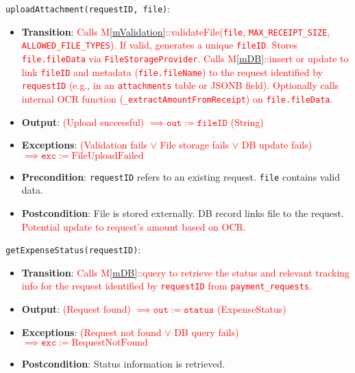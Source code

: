 \documentclass[12pt, titlepage]{article}
\providecommand{\mref}[1]{M\ref{#1}}
\begin{document}
\noindent \texttt{uploadAttachment(requestID, file)}:
\begin{itemize}
    \item \textbf{Transition}: \textcolor{red}{Calls \mref{mValidation}::validateFile(\texttt{file}, \texttt{MAX\_RECEIPT\_SIZE}, \texttt{ALLOWED\_FILE\_TYPES}). If valid, generates a unique \texttt{fileID}. Stores \texttt{file.fileData} via \texttt{FileStorageProvider}. Calls \mref{mDB}::insert or update to link \texttt{fileID} and metadata (\texttt{file.fileName}) to the request identified by \texttt{requestID} (e.g., in an \texttt{attachments} table or JSONB field).} \textcolor{red}{Optionally calls internal OCR function (\texttt{\_extractAmountFromReceipt}) on \texttt{file.fileData}.}
    \item \textbf{Output}: \textcolor{red}{(Upload successful) $\implies \texttt{out} := \texttt{fileID}$ (String)}
    \item \textbf{Exceptions}: \textcolor{red}{(Validation fails $\lor$ File storage fails $\lor$ DB update fails) $\implies \texttt{exc} := \text{FileUploadFailed}$}
    \item \textbf{Precondition}: \texttt{requestID} refers to an existing request. \texttt{file} contains valid data.
    \item \textbf{Postcondition}: File is stored externally. DB record links file to the request. \textcolor{red}{Potential update to request's amount based on OCR.}
\end{itemize}

\noindent \texttt{getExpenseStatus(requestID)}:
\begin{itemize}
    \item \textbf{Transition}: \textcolor{red}{Calls \mref{mDB}::query to retrieve the status and relevant tracking info for the request identified by \texttt{requestID} from \texttt{payment\_requests}.}
    \item \textbf{Output}: \textcolor{red}{(Request found) $\implies \texttt{out} := \texttt{status}$ (ExpenseStatus)}
    \item \textbf{Exceptions}: \textcolor{red}{(Request not found $\lor$ DB query fails) $\implies \texttt{exc} := \text{RequestNotFound}$}
    \item \textbf{Postcondition}: Status information is retrieved.
\end{itemize}
\end{document}
